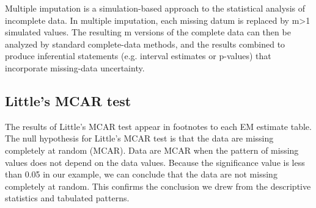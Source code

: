 Multiple imputation is a simulation-based approach to the statistical analysis of incomplete data. In multiple imputation, each missing datum is replaced by m>1 simulated values. The resulting m versions of the complete data can then be analyzed by standard complete-data methods, and the results combined to produce inferential statements (e.g. interval estimates or p-values) that incorporate missing-data uncertainty.

\subsection{Little's MCAR test}
The results of Little’s MCAR test appear in footnotes to each EM estimate table. The null
hypothesis for Little’s MCAR test is that the data are missing completely at random (MCAR).
Data are MCAR when the pattern of missing values does not depend on the data values. Because
the significance value is less than 0.05 in our example, we can conclude that the data are not
missing completely at random. This confirms the conclusion we drew from the descriptive
statistics and tabulated patterns.

